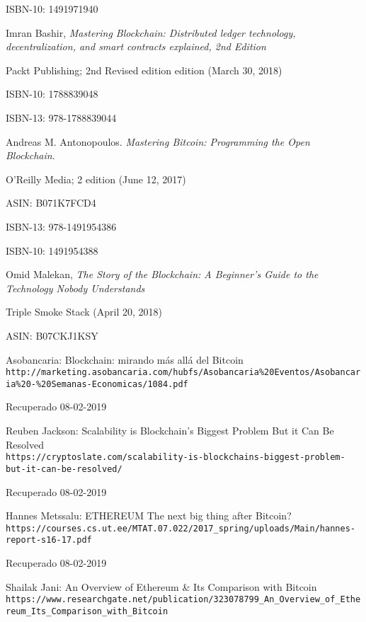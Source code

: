 \documentclass[a4paper,12pt,times,print,index]{Classes/PhDThesisPSnPDF}
\begin{document}
\begin{thebibliography}{40}
		ISBN-10: 1491971940
		
		Imran Bashir, \textit{Mastering Blockchain: Distributed ledger technology, decentralization, and smart contracts explained, 2nd Edition}
		
		Packt Publishing; 2nd Revised edition edition (March 30, 2018)
		
		ISBN-10: 1788839048
		
		ISBN-13: 978-1788839044
		
		Andreas M. Antonopoulos. \textit{Mastering Bitcoin: Programming the Open Blockchain}.
		
		O'Reilly Media; 2 edition (June 12, 2017)
		
		ASIN: B071K7FCD4
		
		ISBN-13: 978-1491954386
		
		ISBN-10: 1491954388
		
		Omid Malekan, \textit{The Story of the Blockchain: A Beginner's Guide to the Technology Nobody Understands}		
		
		Triple Smoke Stack (April 20, 2018)
		
		ASIN: B07CKJ1KSY
		
		Asobancaria: Blockchain: mirando más allá del Bitcoin
		\\\texttt{http://marketing.asobancaria.com/hubfs/Asobancaria\%20Eventos/Asobancaria\%20-\%20Semanas-Economicas/1084.pdf}
		
		Recuperado 08-02-2019
		
		Reuben Jackson: Scalability is Blockchain’s Biggest Problem But it Can Be Resolved
		\\\texttt{https://cryptoslate.com/scalability-is-blockchains-biggest-problem-but-it-can-be-resolved/}
		
		Recuperado 08-02-2019
		
		Hannes Metssalu: ETHEREUM The next big thing after Bitcoin?
		\\\texttt{https://courses.cs.ut.ee/MTAT.07.022/2017\_spring/uploads/Main/hannes-report-s16-17.pdf}
		
		Recuperado 08-02-2019
		
		Shailak Jani: An Overview of Ethereum \& Its Comparison with Bitcoin
		\\\texttt{https://www.researchgate.net/publication/323078799\_An\_Overview\_of\_Ethereum\_Its\_Comparison\_with\_Bitcoin}	
		

\end{thebibliography}
\end{document}
